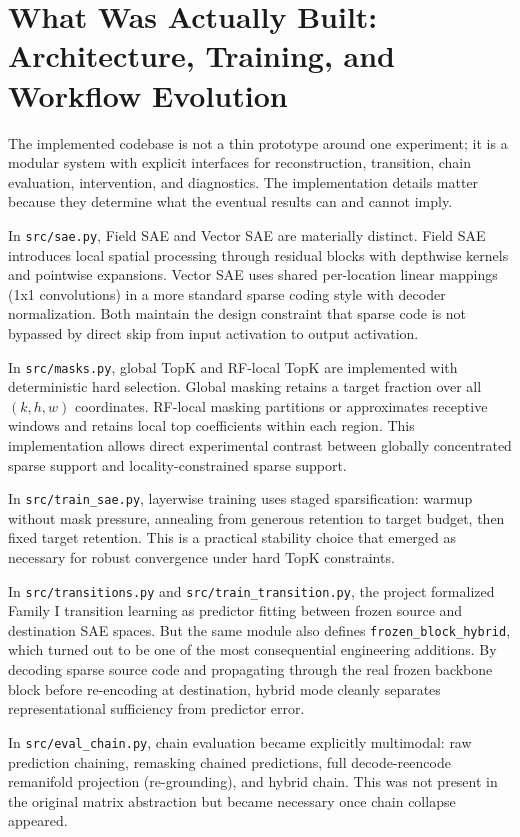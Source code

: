 \documentclass[11pt]{article}
\begin{document}
\section{What Was Actually Built: Architecture, Training, and Workflow Evolution}
The implemented codebase is not a thin prototype around one experiment; it is a modular system with explicit interfaces for reconstruction, transition, chain evaluation, intervention, and diagnostics. The implementation details matter because they determine what the eventual results can and cannot imply.

In \texttt{src/sae.py}, Field SAE and Vector SAE are materially distinct. Field SAE introduces local spatial processing through residual blocks with depthwise kernels and pointwise expansions. Vector SAE uses shared per-location linear mappings (1x1 convolutions) in a more standard sparse coding style with decoder normalization. Both maintain the design constraint that sparse code is not bypassed by direct skip from input activation to output activation.

In \texttt{src/masks.py}, global TopK and RF-local TopK are implemented with deterministic hard selection. Global masking retains a target fraction over all $(k,h,w)$ coordinates. RF-local masking partitions or approximates receptive windows and retains local top coefficients within each region. This implementation allows direct experimental contrast between globally concentrated sparse support and locality-constrained sparse support.

In \texttt{src/train\_sae.py}, layerwise training uses staged sparsification: warmup without mask pressure, annealing from generous retention to target budget, then fixed target retention. This is a practical stability choice that emerged as necessary for robust convergence under hard TopK constraints.

In \texttt{src/transitions.py} and \texttt{src/train\_transition.py}, the project formalized Family I transition learning as predictor fitting between frozen source and destination SAE spaces. But the same module also defines \texttt{frozen\_block\_hybrid}, which turned out to be one of the most consequential engineering additions. By decoding sparse source code and propagating through the real frozen backbone block before re-encoding at destination, hybrid mode cleanly separates representational sufficiency from predictor error.

In \texttt{src/eval\_chain.py}, chain evaluation became explicitly multimodal: raw prediction chaining, remasking chained predictions, full decode-reencode remanifold projection (re-grounding), and hybrid chain. This was not present in the original matrix abstraction but became necessary once chain collapse appeared.
\end{document}
